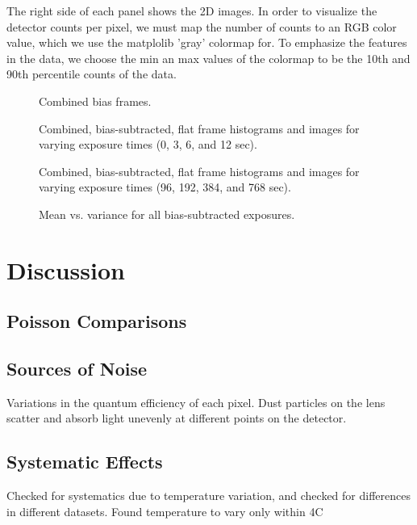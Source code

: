 \documentclass[preprint]{aastex62}
\begin{document}
The right side of each panel shows the 2D images. In order to visualize the detector counts per pixel, we must map the number of counts to an RGB color value, which we use the matplolib 'gray' colormap for. To emphasize the features in the data, we choose the min an max values of the colormap to be the 10th and 90th percentile counts of the data.


\begin{figure}[ht]
\caption{Combined bias frames.} \label{fig:bias}
\end{figure}
\begin{figure}[ht]
\caption{Combined, bias-subtracted, flat frame histograms and images for varying exposure times (0, 3, 6, and 12 sec). \label{fig:flats1}}
\end{figure}
\begin{figure}[ht]
\caption{Combined, bias-subtracted, flat frame histograms and images for varying exposure times (96, 192, 384, and 768 sec). \label{fig:flats2}}
\end{figure}

\begin{figure}[ht]
\caption{Mean vs. variance for all bias-subtracted exposures.} \label{fig:mean_var}
\end{figure}

\section{Discussion}
\subsection{Poisson Comparisons}

\subsection{Sources of Noise}
Variations in the quantum efficiency of each pixel.
Dust particles on the lens scatter and absorb light unevenly at different points on the detector.

\subsection{Systematic Effects}
Checked for systematics due to temperature variation, and checked for differences in different datasets. Found temperature to vary only within 4C
\end{document}
